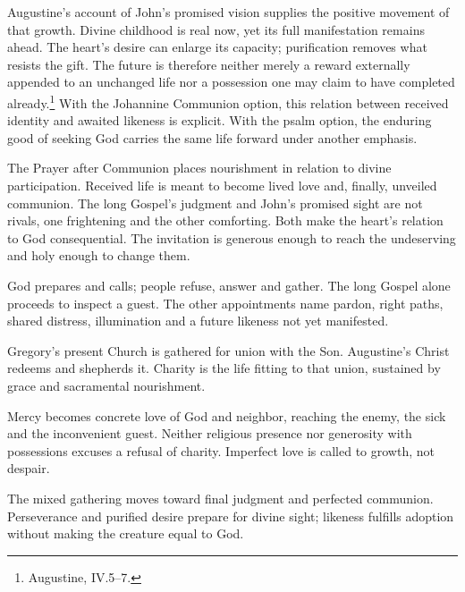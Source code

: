 Augustine's account of John's promised vision supplies the positive movement of that growth. Divine childhood is real now, yet its full manifestation remains ahead. The heart's desire can enlarge its capacity; purification removes what resists the gift. The future is therefore neither merely a reward externally appended to an unchanged life nor a possession one may claim to have completed already.\footnote{Augustine,  IV.5--7.} With the Johannine Communion option, this relation between received identity and awaited likeness is explicit. With the psalm option, the enduring good of seeking God carries the same life forward under another emphasis.

The Prayer after Communion places nourishment in relation to divine participation. Received life is meant to become lived love and, finally, unveiled communion. The long Gospel's judgment and John's promised sight are not rivals, one frightening and the other comforting. Both make the heart's relation to God consequential. The invitation is generous enough to reach the undeserving and holy enough to change them.

\pagebreak
\begin{fourSenses}
\item[Literal.] God prepares and calls; people refuse, answer and gather. The long Gospel alone proceeds to inspect a guest. The other appointments name pardon, right paths, shared distress, illumination and a future likeness not yet manifested.
\item[Allegorical.] Gregory's present Church is gathered for union with the Son. Augustine's Christ redeems and shepherds it. Charity is the life fitting to that union, sustained by grace and sacramental nourishment.
\item[Moral.] Mercy becomes concrete love of God and neighbor, reaching the enemy, the sick and the inconvenient guest. Neither religious presence nor generosity with possessions excuses a refusal of charity. Imperfect love is called to growth, not despair.
\item[Anagogical.] The mixed gathering moves toward final judgment and perfected communion. Perseverance and purified desire prepare for divine sight; likeness fulfills adoption without making the creature equal to God.
\end{fourSenses}
